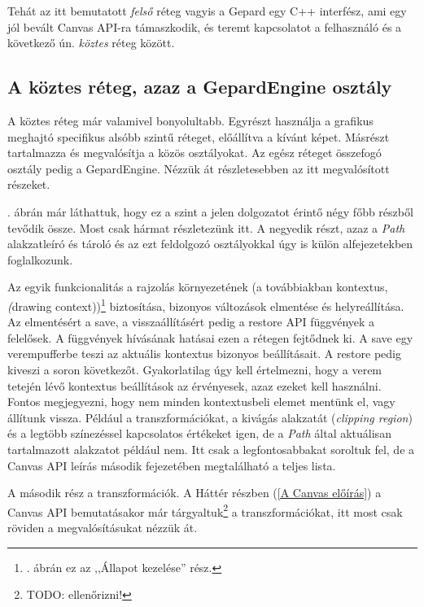 \documentclass[12pt]{report}
\theoremstyle{definition}
\newcommand{\inenglish}[1]{\textsl{#1}}
\newcommand{\func}[1]{{\textsf{\footnotesize{#1}}}}
\begin{document}
Tehát az itt bemutatott \emph{felső} réteg vagyis a \func{Gepard} egy C++
interfész, ami egy jól bevált Canvas API-ra támaszkodik, és teremt kapcsolatot
a felhasználó és a következő ún. \emph{köztes} réteg között.

    \subsection*{A köztes réteg, azaz a GepardEngine osztály}

A köztes réteg már valamivel bonyolultabb. Egyrészt használja a grafikus
meghajtó specifikus alsóbb szintű réteget, előállítva a kívánt képet. Másrészt
tartalmazza és megvalósítja a közös osztályokat. Az egész réteget összefogó
osztály pedig a \func{GepardEngine}. Nézzük át részletesebben az itt
megvalósított részeket.

. ábrán már láthattuk, hogy ez a szint a jelen dolgozatot
érintő négy főbb részből tevődik össze. Most csak hármat részletezünk itt. A
negyedik részt, azaz a \emph{Path} alakzatleíró és tároló és az ezt feldolgozó
osztályokkal úgy is külön alfejezetekben foglalkozunk.

Az egyik funkcionalitás a rajzolás környezetének (a továbbiakban kontextus,
\inenglish(drawing context))\footnote{. ábrán ez az
,,Állapot kezelése'' rész.} biztosítása, bizonyos változások elmentése és
helyreállítása. Az elmentésért a \func{save}, a visszaállításért pedig a
\func{restore} API függvények a felelősek. A függvények hívásának hatásai ezen
a rétegen fejtődnek ki. A \func{save} egy verempufferbe teszi az aktuális
kontextus bizonyos beállításait. A \func{restore} pedig kiveszi a soron
következőt. Gyakorlatilag úgy kell értelmezni, hogy a verem tetején lévő
kontextus beállítások az érvényesek, azaz ezeket kell használni. Fontos
megjegyezni, hogy nem minden kontextusbeli elemet mentünk el, vagy állítunk
vissza. Például a transzformációkat, a kivágás alakzatát (\inenglish{clipping
region}) és a legtöbb színezéssel kapcsolatos értékeket igen, de a \emph{Path}
által aktuálisan tartalmazott alakzatot például nem. Itt csak a
legfontosabbakat soroltuk fel, de a Canvas API leírás \cite{Cabanier:14:HCC}
második fejezetében megtalálható a teljes lista.

A második rész a transzformációk. A Háttér részben (\ref{A Canvas előírás}) a
Canvas API bemutatásakor már tárgyaltuk\footnote{TODO: ellenőrizni!} a
transzformációkat, itt most csak röviden a megvalósításukat nézzük át.
\end{document}

